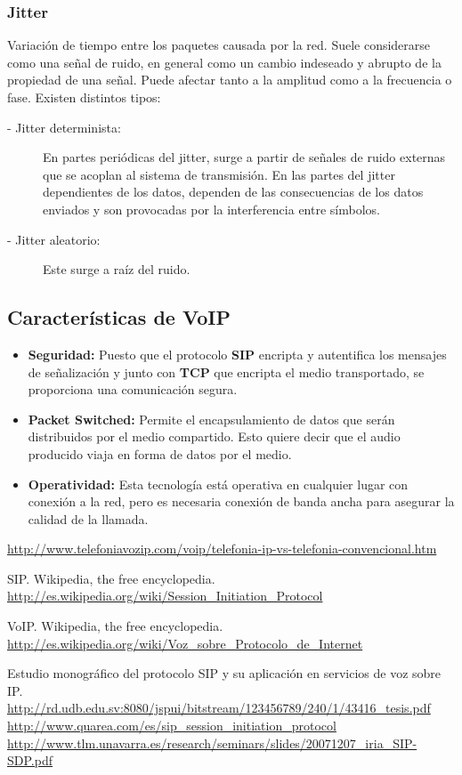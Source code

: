 \documentclass[a4paper, 11pt]{article} %
\begin{document}
		\subsubsection{Jitter} \label{jitter}
			Variación de tiempo entre los paquetes causada por la red. Suele considerarse como una señal de ruido, en general como un cambio indeseado y abrupto de la propiedad de una señal. Puede afectar tanto a la amplitud como a la frecuencia o fase.
			Existen distintos tipos:
			\begin{description}
				\item[- Jitter determinista:] En partes periódicas del jitter, surge a partir de señales de ruido externas que se acoplan al sistema de transmisión. En las partes del jitter dependientes de los datos, dependen de las consecuencias de los datos enviados y son provocadas por la interferencia entre símbolos.
				\item[- Jitter aleatorio:] Este surge a raíz del ruido.
			\end{description}
			
		\subsection{Características de VoIP}
		\begin{itemize}
			\item \textbf{Seguridad:} Puesto que el protocolo \textbf{SIP} encripta y autentifica los mensajes de señalización y junto con \textbf{TCP} que encripta el medio transportado, se proporciona una comunicación segura.
			\item \textbf{Packet Switched:} Permite el encapsulamiento de datos que serán distribuidos por el medio compartido. Esto quiere decir que el audio producido viaja en forma de datos por el medio.
			\item \textbf{Operatividad:} Esta tecnología está operativa en cualquier lugar con conexión a la red, pero es necesaria conexión de banda ancha para asegurar la calidad de la llamada.
		\end{itemize}

\newpage
	\begin{thebibliography}{4}
		\url{http://www.telefoniavozip.com/voip/telefonia-ip-vs-telefonia-convencional.htm}
	
		SIP. Wikipedia, the free encyclopedia.\\
		\url{http://es.wikipedia.org/wiki/Session_Initiation_Protocol}
	
		VoIP. Wikipedia, the free encyclopedia.\\
		\url{http://es.wikipedia.org/wiki/Voz_sobre_Protocolo_de_Internet}
		
		Estudio monográfico del protocolo SIP y su aplicación en servicios de voz sobre IP.\\
		\url{http://rd.udb.edu.sv:8080/jspui/bitstream/123456789/240/1/43416_tesis.pdf}
		\url{http://www.quarea.com/es/sip_session_initiation_protocol}
		\url{http://www.tlm.unavarra.es/research/seminars/slides/20071207_iria_SIP-SDP.pdf}
	\end{thebibliography}
\end{document}
